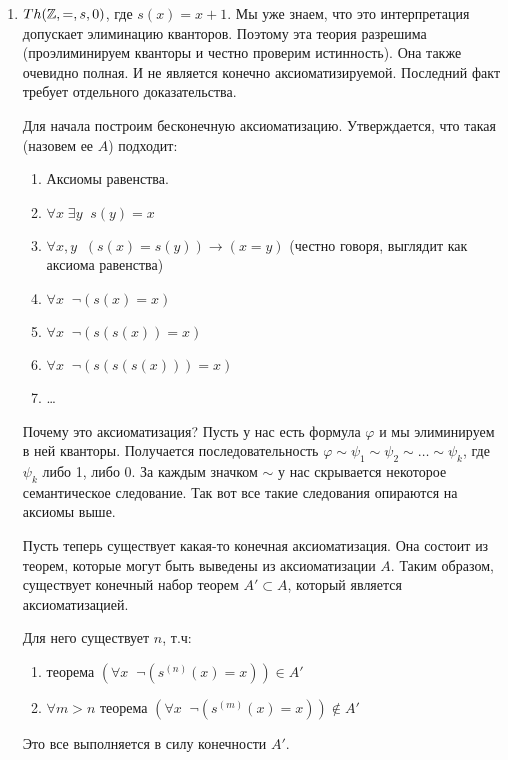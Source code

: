 \begin{example}
    \begin{enumerate}
        \item $Th(\mathbb{Z}, =, s, 0)$, где $s(x) = x+1$. Мы уже знаем, что это интерпретация допускает элиминацию кванторов. Поэтому эта теория разрешима (проэлиминируем кванторы и честно проверим истинность). Она также очевидно полная. И не является конечно аксиоматизируемой. Последний факт требует отдельного доказательства.
        
        Для начала построим бесконечную аксиоматизацию. Утверждается, что такая (назовем ее $A$) подходит: \begin{enumerate}
            \item Аксиомы равенства.
            \item $\forall x \; \exists y \;\; s(y) = x$
            \item $\forall x, y \;\; (s(x) = s(y)) \to (x = y)$ (честно говоря, выглядит как аксиома равенства)
            \item $\forall x \;\;  \lnot(s(x) = x)$
            \item $\forall x \;\;  \lnot(s(s(x)) = x)$
            \item $\forall x \;\;  \lnot(s(s(s(x))) = x)$
            \item \dots
        \end{enumerate}
        Почему это аксиоматизация? Пусть у нас есть формула $\varphi$ и мы элиминируем в ней кванторы. Получается последовательность $\varphi \sim \psi_1 \sim \psi_2 \sim \dots \sim \psi_k$, где $\psi_k$ либо 1, либо 0. За каждым значком $\sim$ у нас скрывается некоторое семантическое следование. Так вот все такие следования опираются на аксиомы выше.

        Пусть теперь существует какая-то конечная аксиоматизация. Она состоит из теорем, которые могут быть выведены из аксиоматизации $A$. Таким образом, существует конечный набор теорем $A' \subset A$, который является аксиоматизацией. 

        Для него существует $n$, т.ч: 
        \begin{enumerate}
            \item теорема $(\forall x \;\; \lnot(s^{(n)}(x) = x)) \in A'$
            \item $\forall m > n$ теорема $(\forall x \;\; \lnot(s^{(m)}(x) = x)) \notin A'$
        \end{enumerate} 
        Это все выполняется в силу конечности $A'$.
        

\end{enumerate}
\end{example}
